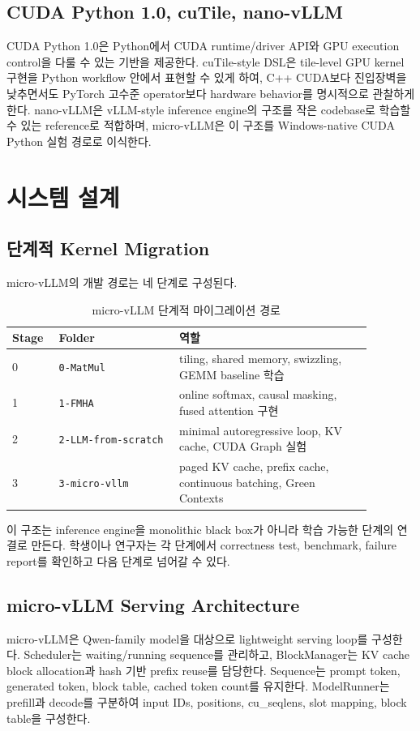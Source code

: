 \documentclass{kcc}
\begin{document}
\subsection{CUDA Python 1.0, cuTile, nano-vLLM}
CUDA Python 1.0은 Python에서 CUDA runtime/driver API와 GPU execution control을 다룰 수 있는 기반을 제공한다. cuTile-style DSL은 tile-level GPU kernel 구현을 Python workflow 안에서 표현할 수 있게 하여, C++ CUDA보다 진입장벽을 낮추면서도 PyTorch 고수준 operator보다 hardware behavior를 명시적으로 관찰하게 한다. nano-vLLM은 vLLM-style inference engine의 구조를 작은 codebase로 학습할 수 있는 reference로 적합하며, micro-vLLM은 이 구조를 Windows-native CUDA Python 실험 경로로 이식한다.

\section{시스템 설계}
\subsection{단계적 Kernel Migration}
micro-vLLM의 개발 경로는 네 단계로 구성된다.

\begin{table}[h]
\centering
\scriptsize
\setlength{\tabcolsep}{2pt}
\begin{tabular}{|p{0.10\linewidth}|p{0.30\linewidth}|p{0.48\linewidth}|}
\hline
\textbf{Stage} & \textbf{Folder} & \textbf{역할} \\ \hline
0 & \texttt{0-MatMul} & tiling, shared memory, swizzling, GEMM baseline 학습 \\ \hline
1 & \texttt{1-FMHA} & online softmax, causal masking, fused attention 구현 \\ \hline
2 & \texttt{2-LLM-from-scratch} & minimal autoregressive loop, KV cache, CUDA Graph 실험 \\ \hline
3 & \texttt{3-micro-vllm} & paged KV cache, prefix cache, continuous batching, Green Contexts \\ \hline
\end{tabular}
\caption{micro-vLLM 단계적 마이그레이션 경로}
\end{table}

이 구조는 inference engine을 monolithic black box가 아니라 학습 가능한 단계의 연결로 만든다. 학생이나 연구자는 각 단계에서 correctness test, benchmark, failure report를 확인하고 다음 단계로 넘어갈 수 있다.

\subsection{micro-vLLM Serving Architecture}
micro-vLLM은 Qwen-family model을 대상으로 lightweight serving loop를 구성한다. Scheduler는 waiting/running sequence를 관리하고, BlockManager는 KV cache block allocation과 hash 기반 prefix reuse를 담당한다. Sequence는 prompt token, generated token, block table, cached token count를 유지한다. ModelRunner는 prefill과 decode를 구분하여 input IDs, positions, cu\_seqlens, slot mapping, block table을 구성한다.
\end{document}
